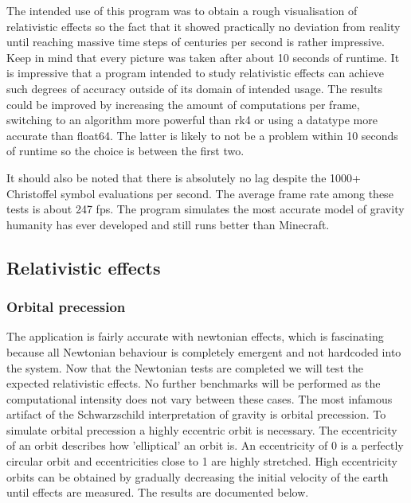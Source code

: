\documentclass{article}
\begin{document}
The intended use of this program was to obtain a rough visualisation of relativistic effects so the fact that it showed practically no deviation from reality until reaching massive time steps of centuries per second is rather impressive. Keep in mind that every picture was taken after about 10 seconds of runtime. It is impressive that a program intended to study relativistic effects can achieve such degrees of accuracy outside of its domain of intended usage. The results could be improved by increasing the amount of computations per frame, switching to an algorithm more powerful than rk4 or using a datatype more accurate than float64. The latter is likely to not be a problem within 10 seconds of runtime so the choice is between the first two.

It should also be noted that there is absolutely no lag despite the 1000+ Christoffel symbol evaluations per second. The average frame rate among these tests is about 247 fps. The program simulates the most accurate model of gravity humanity has ever developed and still runs better than Minecraft.

\subsection{Relativistic effects}

\subsubsection{Orbital precession}
The application is fairly accurate with newtonian effects, which is fascinating because all Newtonian behaviour is completely emergent and not hardcoded into the system. Now that the Newtonian tests are completed we will test the expected relativistic effects. No further benchmarks will be performed as the computational intensity does not vary between these cases. The most infamous artifact of the Schwarzschild interpretation of gravity is orbital precession. To simulate orbital precession a highly eccentric orbit is necessary. The eccentricity of an orbit describes how 'elliptical' an orbit is. An eccentricity of 0 is a perfectly circular orbit and eccentricities close to 1 are highly stretched. High eccentricity orbits can be obtained by gradually decreasing the initial velocity of the earth until effects are measured. The results are documented below.
\end{document}
